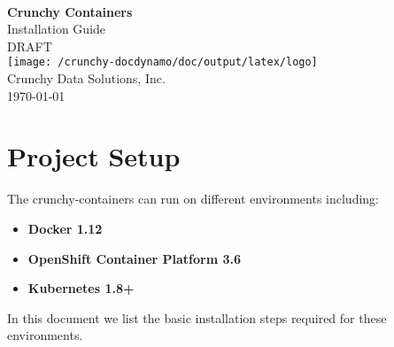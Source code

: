 \documentclass[letterpaper,12pt]{article}
\let\stdsection\section
\renewcommand\section{\newpage\stdsection}
\begin{document}
\hypersetup{pageanchor=false}

\makeatletter
    \begin{titlepage}
        \begin{center}
            {\large \ }\\[18ex]
            {\huge \bfseries Crunchy Containers}\\[1ex]
            {\large Installation Guide}\\[12ex]
            {\large DRAFT}\\[12ex]
            \texttt{[image: /crunchy-docdynamo/doc/output/latex/logo]}\\[12ex]
            {\large Crunchy Data Solutions, Inc.}\\[1ex]
            {\large \today}
        \end{center}
    \end{titlepage}
\makeatother
\thispagestyle{empty}
\newpage

\hypersetup{pageanchor=true}

\setcounter{tocdepth}{3}
\thispagestyle{plain}
\renewcommand\contentsname{Table of Contents}
\tableofcontents


\section{Project Setup}\label{/_project_setup}

The crunchy-containers can run on different environments including:

\begin{itemize}
    \item \textbf{Docker 1.12} 
    \item \textbf{OpenShift Container Platform 3.6} 
    \item \textbf{Kubernetes 1.8+} 
\end{itemize}
In this document we list the basic installation steps required for these environments.
\end{document}
